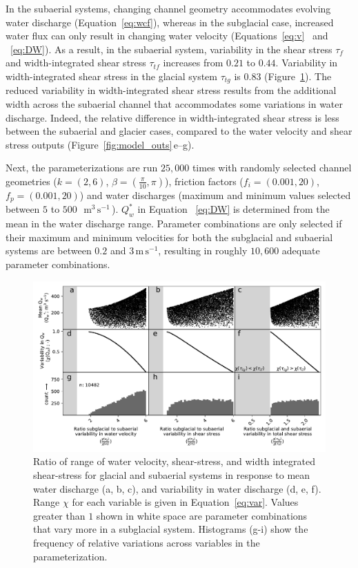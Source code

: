 \documentclass[draft]{agujournal2019}
\newcommand{\mmms}{$\,\mathrm{m^3\, s^{-1}}$\,}
\newcommand{\unit}[1]{$\mathrm{#1}$}
\begin{document}
  In the subaerial systems, changing channel geometry accommodates evolving water discharge  (Equation~\ref{eq:wcf}), whereas in the subglacial case, increased water flux can only result in changing water velocity (Equations~\ref{eq:v}~ and ~\ref{eq:DW}).
  As a result, in the subaerial system, variability in the shear stress $\tau_f$ and width-integrated shear stress $\tau_{tf}$ increases from $0.21$ to $0.44$. Variability in width-integrated shear stress  in the glacial system $\tau_{tg}$ is $0.83$ (Figure~\ref{fig:range}).
  The reduced variability in width-integrated shear stress results from the additional width across the subaerial channel that accommodates some variations in water discharge.
  Indeed, the relative  difference in width-integrated shear stress is less between the subaerial and glacier cases, compared to the water velocity and shear stress outputs (Figure~\ref{fig:model_outs}\,e--g).

  
  Next, the parameterizations are run $25,000$ times with randomly selected channel geometries ($k=(2,6)$, $\beta=(\frac{\pi}{10},\pi)$), friction factors ($f_i=(0.001,20)$, $f_p=(0.001,20)$) and water discharges (maximum and minimum values selected between $5$ to $500$ \,\mmms). $Q_w^*$ in Equation ~\ref{eq:DW} is determined from the mean in the water discharge range. Parameter combinations are only selected if their maximum and minimum velocities for both the subglacial and subaerial systems are between $0.2$ and $3$\,\unit{m}\,\unit{s}$^{-1}$, resulting in roughly $10,600$ adequate parameter combinations. 
  
  
  \begin{center}
    \begin{figure}[H]
      \includegraphics[width=0.7\linewidth]{multi_run.pdf}
      \caption{Ratio of range of water velocity, shear-stress, and width integrated shear-stress for glacial and subaerial systems in response to mean water discharge (a, b, c), and  variability in water discharge (d, e, f).  
        Range  $\chi$ for each variable is given in Equation~\ref{eq:var}. Values greater than $1$ shown in white space are parameter combinations that vary more in a subglacial  system.
        Histograms (g-i) show the frequency of relative variations across variables in the parameterization.}
      \label{fig:range}
    \end{figure}
  \end{center}
  
\end{document}
